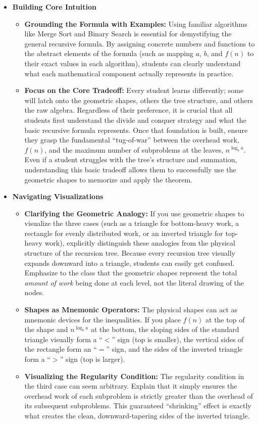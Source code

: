\documentclass[11pt, a4paper]{article}
\begin{document}
\begin{itemize}

    \item \textbf{Building Core Intuition}
    \begin{itemize}
        \item \textbf{Grounding the Formula with Examples:} Using familiar algorithms like Merge Sort and Binary Search is essential for demystifying the general recursive formula. By assigning concrete numbers and functions to the abstract elements of the formula (such as mapping $a$, $b$, and $f(n)$ to their exact values in each algorithm), students can clearly understand what each mathematical component actually represents in practice.
        \item \textbf{Focus on the Core Tradeoff:} Every student learns differently; some will latch onto the geometric shapes, others the tree structure, and others the raw algebra. Regardless of their preference, it is crucial that all students first understand the divide and conquer strategy and what the basic recursive formula represents. Once that foundation is built, ensure they grasp the fundamental ``tug-of-war'' between the overhead work, $f(n)$, and the maximum number of subproblems at the leaves, $n^{\log_b a}$. Even if a student struggles with the tree's structure and summation, understanding this basic tradeoff allows them to successfully use the geometric shapes to memorize and apply the theorem.
    \end{itemize}

    \item \textbf{Navigating Visualizations}
    \begin{itemize}
        \item \textbf{Clarifying the Geometric Analogy:} If you use geometric shapes to visualize the three cases (such as a triangle for bottom-heavy work, a rectangle for evenly distributed work, or an inverted triangle for top-heavy work), explicitly distinguish these analogies from the physical structure of the recursion tree. Because every recursion tree visually expands downward into a triangle, students can easily get confused. Emphasize to the class that the geometric shapes represent the total \textit{amount of work} being done at each level, not the literal drawing of the nodes.
        \item \textbf{Shapes as Mnemonic Operators:} The physical shapes can act as mnemonic devices for the inequalities. If you place $f(n)$ at the top of the shape and $n^{\log_b a}$ at the bottom, the sloping sides of the standard triangle visually form a ``$<$'' sign (top is smaller), the vertical sides of the rectangle form an ``$=$'' sign, and the sides of the inverted triangle form a ``$>$'' sign (top is larger).
        \item \textbf{Visualizing the Regularity Condition:} The regularity condition in the third case can seem arbitrary. Explain that it simply ensures the overhead work of each subproblem is strictly greater than the overhead of its subsequent subproblems. This guaranteed ``shrinking'' effect is exactly what creates the clean, downward-tapering sides of the inverted triangle.
    \end{itemize}


\end{itemize}
\end{document}
